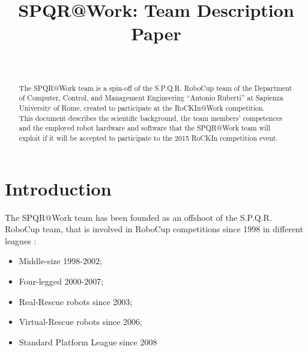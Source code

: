 \documentclass[conference]{IEEEtran}
\begin{document}
%
\title{SPQR@Work: Team Description Paper}

\author{\\
}

\maketitle


\begin{abstract}
The SPQR@Work team is a spin-off of the S.P.Q.R. RoboCup team of the Department of Computer, Control, and Management Engineering “Antonio Ruberti” at Sapienza University of Rome, created to participate at the RoCKIn@Work competition.\\
This document describes the scientific background, the team members' competences and the employed robot hardware and software that the SPQR@Work team will exploit if it will be accepted to participate to the 2015 RoCKIn competition event.
\end{abstract}

\section{Introduction}
The SPQR@Work team has been founded as an offshoot of the S.P.Q.R. RoboCup team, that is involved in RoboCup competitions since 1998 in different leagues :
\begin{itemize}
\item Middle-size 1998-2002;
\item Four-legged 2000-2007;
\item Real-Rescue robots since 2003;
\item Virtual-Rescue robots since 2006;
\item Standard Platform League since 2008
 \end{itemize}
\end{document}
